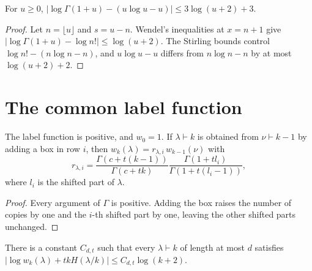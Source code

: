 \begin{lemma}
    \label{lem:log_gamma_stirling}
    \leanok
    For $u\ge0$,
    $|\log\Gamma(1+u)-(u\log u-u)|\le3\log(u+2)+3$.
\end{lemma}

\begin{proof}\leanok
    Let $n=\lfloor u\rfloor$ and $s=u-n$. Wendel's inequalities at $x=n+1$
    give $|\log\Gamma(1+u)-\log n!|\le\log(u+2)$. The Stirling bounds control
    $\log n!-(n\log n-n)$, and $u\log u-u$ differs from $n\log n-n$ by at most
    $\log(u+2)+2$.
\end{proof}

\section{The common label function}

\begin{lemma}
    \label{lem:replica_weight_ratio}
    \leanok
    The label function is positive, and $w_0=1$. If $\lambda\vdash k$ is
    obtained from $\nu\vdash k-1$ by adding a box in row $i$, then
    $w_k(\lambda)=r_{\lambda,i}\,w_{k-1}(\nu)$ with
    \[
        r_{\lambda,i}=\frac{\Gamma(c+t(k-1))}{\Gamma(c+tk)}
            \frac{\Gamma(1+tl_i)}{\Gamma(1+t(l_i-1))},
    \]
    where $l_i$ is the shifted part of $\lambda$.
\end{lemma}

\begin{proof}\leanok
    Every argument of $\Gamma$ is positive. Adding the box raises the number of
    copies by one and the $i$-th shifted part by one, leaving the other shifted
    parts unchanged.
\end{proof}

\begin{lemma}
    \label{lem:replica_weight_entropy}
    \leanok
    There is a constant $C_{d,t}$ such that every $\lambda\vdash k$ of length at
    most $d$ satisfies
    $|\log w_k(\lambda)+tkH(\lambda/k)|\le C_{d,t}\log(k+2)$.
\end{lemma}

